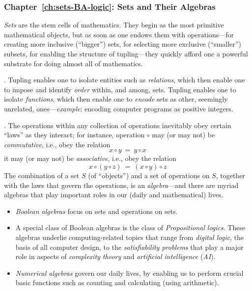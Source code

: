 \subsubsection{Chapter~\ref{ch:sets-BA-logic}: Sets and Their Algebras}

{\em Sets} are the stem cells of mathematics.  They begin as the most primitive mathematical objects, but as soon as one endows them with operations---for creating more inclusive (``bigger'') sets, for selecting more exclusive (``smaller'') subsets, for enabling the structure of tupling---they quickly afford one a powerful substrate for doing almost all of mathematics.

\medskip

.
Tupling enables one to isolate entities such as {\em relations}, which then enable one to impose and identify {\em order} within, and among, sets.  Tupling enables one to isolate {\em functions}, which then enable one to {\em encode} sets as other, seemingly unrelated, ones---{\em example}: encoding computer programs as positive integers.

\medskip

.
The operations within any collection of operations inevitably obey certain ``laws'' as they interact; for instance, operation $\circ$ may (or may not) be {\em commutative}, i.e., obey the relation
\[ x \circ y \ = \ y \circ x \]
it may (or may not) be {\em associative}, i.e., obey the relation
\[ x \circ (y \circ z) \ = \ (x \circ y) \circ z \]
The combination of a set $S$ (of ``objects'') and a set of operations on $S$, together with the laws that govern the operations, is an {\em algebra}---and there are myriad algebras that play important roles in our (daily and mathematical) lives.
\begin{itemize}
\item
{\em Boolean algebras} focus on sets and operations on sets.
\medskip\item
A special class of Boolean algebras is the class of {\em Propositional logics}.  These algebras underlie computing-related topics that range from {\em digital logic}, the basis of all computer design, to the {\em satisfiability problems} that play a major role in aspects of  {\em complexity theory} and {\em artificial intelligence} ({\em AI}).
\medskip\item
{\em Numerical algebras} govern our daily lives, by enabling us to perform crucial basic functions such as counting and calculating (using arithmetic).
\end{itemize}

